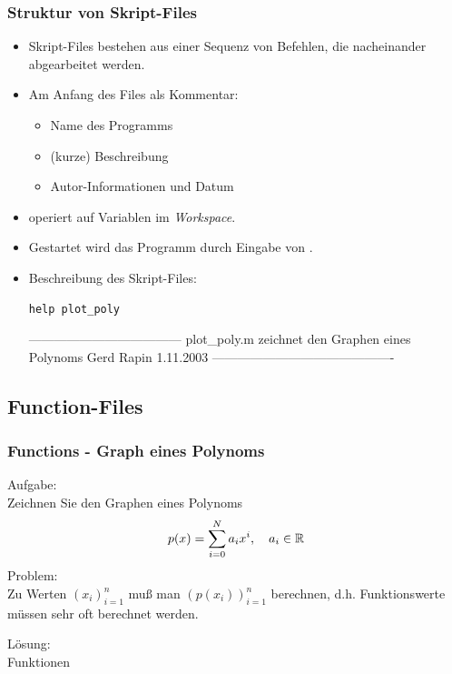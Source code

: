 \documentclass[hyperref={xetex}]{beamer}
\begin{document}
\begin{frame}[fragile]\frametitle{Struktur von Skript-Files}
\begin{itemize}
\item Skript-Files bestehen aus einer Sequenz von Befehlen, die
  nacheinander abgearbeitet werden. 
\item Am Anfang des Files als Kommentar: 
\begin{itemize}
\item Name des Programms 
\item (kurze) Beschreibung
\item Autor-Informationen und Datum
\end{itemize}

\item operiert auf Variablen im \textit{Workspace}.

\item Gestartet wird das Programm  durch Eingabe von
  .

\item Beschreibung des Skript-Files:
\begin{lstlisting}
help plot_poly
\end{lstlisting}
\begin{matlab}
------------------------------------
     plot_poly.m    
  zeichnet den Graphen eines Polynoms 
  Gerd Rapin           1.11.2003
------------------------------------------- 
\end{matlab}


\end{itemize}
\end{frame}

\subsection{Function-Files}

\begin{frame}[fragile]\frametitle{Functions - Graph eines Polynoms}

\alert{Aufgabe:}\\
Zeichnen Sie  den Graphen eines Polynoms
\vspace*{-0.4cm}
\[ p(x)= \sum_{i=0}^N a_i x^i, \quad a_i \in \mathbb{R} 
\vspace*{-0.4cm} \]
\alert{Problem:}\\
Zu Werten $(x_i)_{i=1}^n$ muß man $(p(x_i))_{i=1}^n$ berechnen,
d.h. Funktionswerte müssen sehr oft berechnet werden.

\alert{Lösung:}\\
Funktionen
\end{frame}
\end{document}
